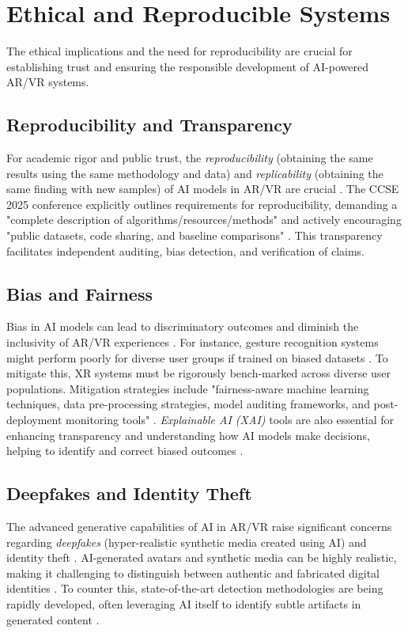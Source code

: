 \documentclass[conference]{IEEEtran}
\begin{document}
\section{Ethical and Reproducible Systems}
The ethical implications and the need for reproducibility are crucial for establishing trust and ensuring the responsible development of AI-powered AR/VR systems.

\subsection{Reproducibility and Transparency}
For academic rigor and public trust, the \textit{reproducibility} (obtaining the same results using the same methodology and data) and \textit{replicability} (obtaining the same finding with new samples) of AI models in AR/VR are crucial \cite{Roth2021Reproducibility}. The CCSE 2025 conference explicitly outlines requirements for reproducibility, demanding a "complete description of algorithms/resources/methods" and actively encouraging "public datasets, code sharing, and baseline comparisons" \cite{CCSE}. This transparency facilitates independent auditing, bias detection, and verification of claims.

\subsection{Bias and Fairness}
Bias in AI models can lead to discriminatory outcomes and diminish the inclusivity of AR/VR experiences \cite{Johnson2025AlgorithmicFairness}. For instance, gesture recognition systems might perform poorly for diverse user groups if trained on biased datasets \cite{Gupta2025}. To mitigate this, XR systems must be rigorously bench-marked across diverse user populations. Mitigation strategies include "fairness-aware machine learning techniques, data pre-processing strategies, model auditing frameworks, and post-deployment monitoring tools" \cite{Johnson2025AlgorithmicFairness}. \textit{Explainable AI (XAI)} tools are also essential for enhancing transparency and understanding how AI models make decisions, helping to identify and correct biased outcomes \cite{Johnson2025AlgorithmicFairness}.

\subsection{Deepfakes and Identity Theft}
The advanced generative capabilities of AI in AR/VR raise significant concerns regarding \textit{deepfakes} (hyper-realistic synthetic media created using AI) and identity theft \cite{Johnson2025AIauthenticity}. AI-generated avatars and synthetic media can be highly realistic, making it challenging to distinguish between authentic and fabricated digital identities \cite{Johnson2023DeepfakeSurvey}. To counter this, state-of-the-art detection methodologies are being rapidly developed, often leveraging AI itself to identify subtle artifacts in generated content \cite{Johnson2025VoiceAuth}.
\end{document}
